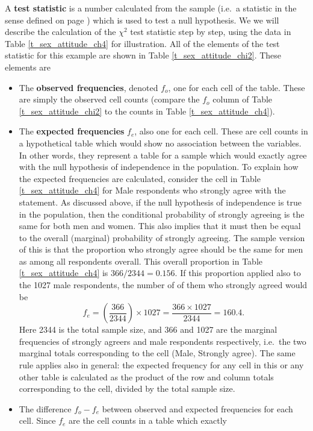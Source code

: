 A \textbf{test statistic} is a number calculated from the sample (i.e.\
a statistic in the sense defined on page \pageref{p_statistic}) which is
used to test a null hypothesis. We we will describe the calculation of
the $\chi^{2}$ test statistic step by step, using the data in Table
\ref{t_sex_attitude_ch4} for illustration.
All of the elements of the test statistic for this example
are shown in Table \ref{t_sex_attitude_chi2}. These elements are
\begin{itemize}
\item
The \textbf{observed frequencies}, denoted $f_{o}$,
one for each cell of the table. These are simply the observed
cell counts (compare the $f_{o}$ column of Table \ref{t_sex_attitude_chi2} to
the counts in Table \ref{t_sex_attitude_ch4}).
\item
The \textbf{expected frequencies} $f_{e}$, also one for each cell. These
are cell counts in a hypothetical table which would show no association between
the variables. In other words, they represent a table for a sample which
would exactly agree with the null hypothesis of independence in the
population. To explain how the expected frequencies are calculated,
consider the cell in Table \ref{t_sex_attitude_ch4} for Male respondents
who strongly agree with the statement. As discussed above, if the null
hypothesis of independence is true in the population, then the
conditional probability of strongly agreeing is the same for both men
and women. This also implies that it must then be equal to
the overall (marginal) probability of strongly agreeing.
The sample version of this is that the proportion who strongly
agree should be
the same for men as among all respondents overall. This overall
proportion in Table \ref{t_sex_attitude_ch4} is $366/2344=0.156$. If this
proportion applied also to the 1027 male respondents, the number of
of them who strongly agreed would be
\[
f_{e} = \left(\frac{366}{2344}\right)\times 1027 =
\frac{366\times 1027}{2344}=160.4.
\]
Here 2344 is the total sample size, and 366 and 1027 are the marginal
frequencies of strongly agreers and male respondents respectively, i.e.\
the two marginal totals corresponding to the cell (Male, Strongly
agree). The same rule applies also in general: the expected frequency
for any cell in this or any other table is calculated as the product of
the row and column totals corresponding to the cell, divided by the
total sample size.
\item
The difference $f_{o}-f_{e}$ between observed and expected frequencies
for each cell. Since $f_{e}$ are the cell counts in a table which exactly

\end{itemize}
